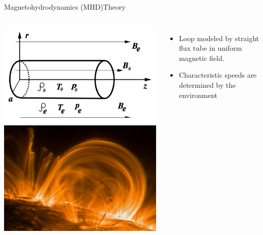 \documentclass[table]{beamer}
\begin{document}
\begin{frame}{Magnetohydrodynamics (MHD)}{Theory}
    \begin{columns}
        \includegraphics[width=\textwidth]{cylinder.png}\\
        \includegraphics[width=\textwidth]{loop.jpg}
        \begin{itemize}
            \item Loop modeled by straight flux tube in uniform magnetic field.
            \item Characteristic speeds are determined by the
                environment
        \end{itemize}
    \end{columns}
\end{frame}%
\end{document}

